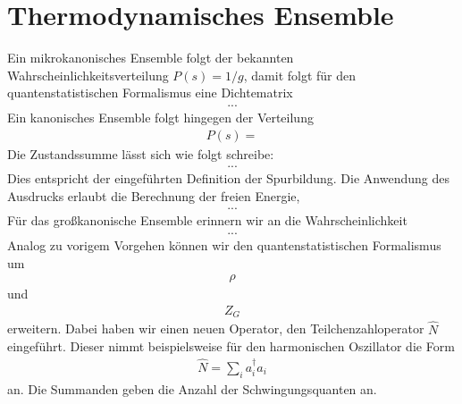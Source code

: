 \section{Thermodynamisches Ensemble}
Ein mikrokanonisches Ensemble folgt der bekannten Wahrscheinlichkeitsverteilung $P(s)=1/g$, damit folgt für den quantenstatistischen Formalismus eine Dichtematrix 
\begin{align*}
    ...
\end{align*}
Ein kanonisches Ensemble folgt hingegen der Verteilung
\begin{align*}
    P(s)=
\end{align*} 
Die Zustandssumme lässt sich wie folgt schreibe:
\begin{align*}
    ...
\end{align*}
Dies entspricht der eingeführten Definition der Spurbildung.
Die Anwendung des Ausdrucks erlaubt die Berechnung der freien Energie,
\begin{align*}
    ...
\end{align*}
Für das großkanonische Ensemble erinnern wir an die Wahrscheinlichkeit
\begin{align*}
    ...
\end{align*}
Analog zu vorigem Vorgehen können wir den quantenstatistischen Formalismus um 
\begin{align*}
    \rho
\end{align*}
und 
\begin{align*}
    Z_G
\end{align*}
erweitern. Dabei haben wir einen neuen Operator, den Teilchenzahloperator $\widehat{N}$ eingeführt. Dieser nimmt beispielsweise für den harmonischen Oszillator die Form 
\begin{align*}
    \widehat{N}=\sum_i a_i^\dagger a_i
\end{align*}
an. Die Summanden geben die Anzahl der Schwingungsquanten an.